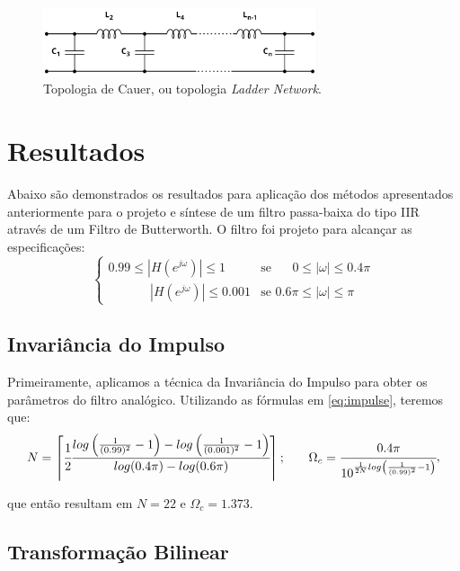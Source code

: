 \documentclass[a4paper,11pt]{article}
\numberwithin{figure}{section}
\numberwithin{equation}{section}
\numberwithin{table}{section}
\theoremstyle{definition}
\begin{document}
\begin{figure}[ht] \centering
	\includegraphics[width=0.72\textwidth]{ladder}
	\caption{Topologia de Cauer, ou topologia \textit{Ladder Network}.}
\end{figure}

\section{Resultados}

Abaixo são demonstrados os resultados para aplicação dos métodos apresentados anteriormente para o projeto e síntese de um filtro passa-baixa do tipo IIR através de um Filtro de Butterworth. O filtro foi projeto para alcançar as especificações:
\begin{equation}
\begin{cases}
0.99 \leq | H(e^{j\omega}) | \leq 1 & \text{se } \phantom{.4\pi}0 \leq |\omega| \leq 0.4\pi \\
\phantom{0.99 \leq\ }| H(e^{j\omega}) | \leq 0.001 & \text{se } 0.6\pi \leq |\omega| \leq \pi
\end{cases}
\end{equation}

\subsection{Invariância do Impulso}

Primeiramente, aplicamos a técnica da Invariância do Impulso para obter os parâmetros do filtro analógico. Utilizando as fórmulas em \eqref{eq:impulse}, teremos que:
\begin{equation}
\begin{matrix}
	N = \left\lceil \cfrac{1}{2} \cfrac{log \left(\frac{1}{(0.99)^2} - 1 \right) - log \left( \frac{1}{(0.001)^2} - 1 \right)}{log(0.4\pi) - log(0.6\pi)} \right\rceil; & & 
	\Omega_c = \cfrac{0.4\pi}{10^{\frac{1}{2N} log \left(\frac{1}{(0.99)^2} - 1 \right)}}
\end{matrix},
\end{equation}

\noindent que então resultam em $N = 22$ e $\Omega_c = 1.373$. 

\subsection{Transformação Bilinear}
\end{document}

